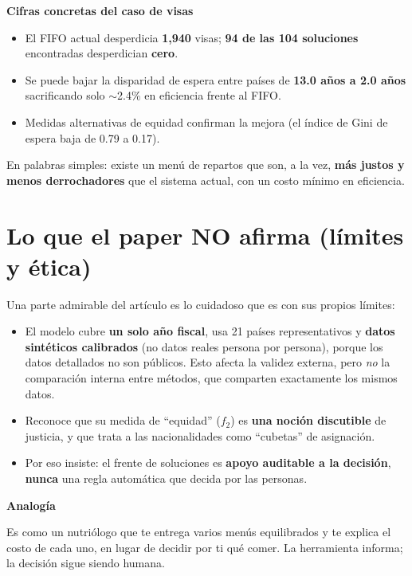 \documentclass[11pt]{article}
\newcommand{\cajacolor}{cajadato}
\newenvironment{caja}[2]{%
  \par\medskip\noindent
  \renewcommand{\cajacolor}{#1}%
  \begin{lrbox}{\cajabox}%
  \begin{minipage}{\dimexpr\linewidth-2\fboxsep-1.2em\relax}%
  \setlength{\parskip}{0.5em}%
  {\bfseries\color{acento2}#2}\par\smallskip}
  {\end{minipage}%
  \end{lrbox}%
  \setlength{\fboxsep}{0.6em}%
  \colorbox{\cajacolor}{\usebox{\cajabox}}\par\medskip}
\newcommand{\analogia}[1]{\begin{caja}{cajaanalogia}{Analogía}#1\end{caja}}
\begin{document}
\begin{caja}{cajadato}{Cifras concretas del caso de visas}
\begin{itemize}[leftmargin=1.2em, nosep]
  \item El FIFO actual desperdicia \textbf{1{,}940} visas; \textbf{94 de las 104 soluciones} encontradas desperdician \textbf{cero}.
  \item Se puede bajar la disparidad de espera entre países de \textbf{13.0 años a 2.0 años} sacrificando solo $\sim$2.4\% en eficiencia frente al FIFO.
  \item Medidas alternativas de equidad confirman la mejora (el índice de Gini de espera baja de 0.79 a 0.17).
\end{itemize}
\end{caja}

En palabras simples: existe un menú de repartos que son, a la vez, \textbf{más justos y menos derrochadores} que el sistema actual, con un costo mínimo en eficiencia.

\section{Lo que el paper NO afirma (límites y ética)}

Una parte admirable del artículo es lo cuidadoso que es con sus propios límites:

\begin{itemize}[leftmargin=1.4em]
  \item El modelo cubre \textbf{un solo año fiscal}, usa 21 países representativos y \textbf{datos sintéticos calibrados} (no datos reales persona por persona), porque los datos detallados no son públicos. Esto afecta la validez externa, pero \emph{no} la comparación interna entre métodos, que comparten exactamente los mismos datos.
  \item Reconoce que su medida de ``equidad'' ($f_2$) es \textbf{una noción discutible} de justicia, y que trata a las nacionalidades como ``cubetas'' de asignación.
  \item Por eso insiste: el frente de soluciones es \textbf{apoyo auditable a la decisión}, \textbf{nunca} una regla automática que decida por las personas.
\end{itemize}

\analogia{
Es como un nutriólogo que te entrega varios menús equilibrados y te explica el costo de cada uno, en lugar de decidir por ti qué comer. La herramienta informa; la decisión sigue siendo humana.
}
\end{document}
